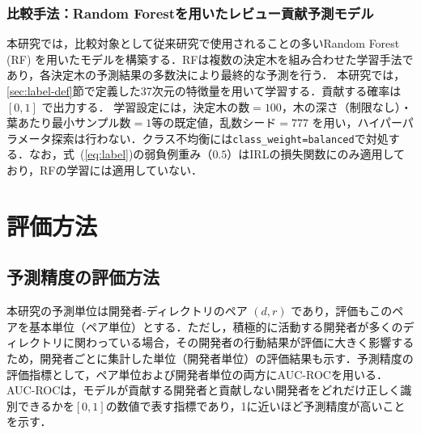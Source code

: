 \documentclass[submit,noauthor,ses,dvipdfmx]{ipsj}
\begin{document}
\subsubsection{比較手法：Random Forestを用いたレビュー貢献予測モデル}\label{sec:rf}
本研究では，比較対象として従来研究で使用されることの多いRandom Forest (RF) を用いたモデルを構築する．RFは複数の決定木を組み合わせた学習手法であり，各決定木の予測結果の多数決により最終的な予測を行う．
本研究では，\ref{sec:label-def}節で定義した37次元の特徴量を用いて学習する\cite{breiman_rf}．貢献する確率は $[0, 1]$ で出力する． 学習設定には，決定木の数$= 100$，木の深さ（制限なし）・葉あたり最小サンプル数$=1$等の既定値，乱数シード$=777$ を用い，ハイパーパラメータ探索は行わない．クラス不均衡には\texttt{class\_weight=balanced}で対処する．なお，式~(\ref{eq:label})の弱負例重み（$0.5$）はIRLの損失関数にのみ適用しており，RFの学習には適用していない．

\section{評価方法}\label{sec:evaluation}

\subsection{予測精度の評価方法}
本研究の予測単位は開発者-ディレクトリのペア $(d, r)$ であり，評価もこのペアを基本単位（ペア単位）とする．ただし，積極的に活動する開発者が多くのディレクトリに関わっている場合，その開発者の行動結果が評価に大きく影響するため，開発者ごとに集計した単位（開発者単位）の評価結果も示す．予測精度の評価指標として，ペア単位および開発者単位の両方にAUC-ROCを用いる．AUC-ROCは，モデルが貢献する開発者と貢献しない開発者をどれだけ正しく識別できるかを$[0, 1]$の数値で表す指標であり，1に近いほど予測精度が高いことを示す．



\end{document}
